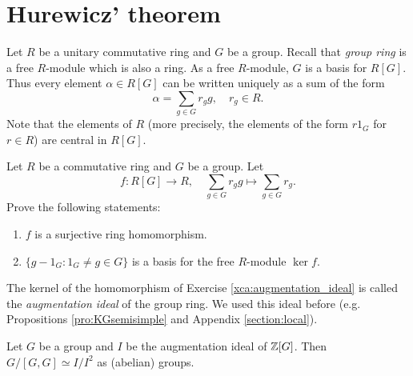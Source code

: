 \section{Hurewicz' theorem}
\label{section:Hurewicz}

Let $R$ be a unitary commutative ring and $G$ be a group. Recall that \emph{group ring} is a free $R$-module which is also a ring. As a free $R$-module, $G$ is a basis for $R[G]$. Thus every element $\alpha\in R[G]$ can be written uniquely as 
a sum of the form 
\[
\alpha=\sum_{g\in G}r_gg,\quad r_g\in R.
\]
Note that the elements of $R$ (more precisely, the elements of the form $r1_G$ for $r\in R$) are central in $R[G]$. 

\begin{exercise}
\label{xca:augmentation_ideal}
    Let $R$ be a commutative ring and $G$ be a group. Let 
    \[
    f\colon R[G] \to R,\quad 
    \sum_{g \in G} r_g g\mapsto \sum_{g \in G} r_g.
    \]
    Prove the following statements:
    \begin{enumerate}
        \item $f$ is a surjective ring
            homomorphism. 
        \item $\{g - 1_G: 1_G\ne g \in G\}$ is a    basis for the free $R$-module $\ker f$.
    \end{enumerate}
\end{exercise}

The kernel of the homomorphism of Exercise \ref{xca:augmentation_ideal} is 
called the \emph{augmentation ideal} of
the group ring. We used this ideal before (e.g. Propositions \ref{pro:KGsemisimple} and Appendix \ref{section:local}). 

\begin{theorem}[Hurewicz]
    \label{thm:Hurewicz}
    Let $G$ be a group and $I$ be the augmentation ideal of $\mathbb{Z}[G]$. 
    Then $G/[G,G]\simeq I/I^2$ as (abelian) groups. 
\end{theorem}

